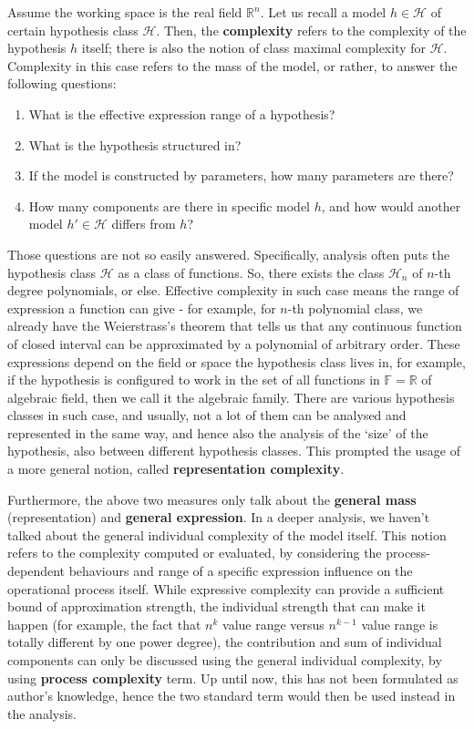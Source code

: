 Assume the working space is the real field $\mathbb{R}^{n}$. Let us recall a model $h\in\mathcal{H}$ of certain hypothesis class $\mathcal{H}$. Then, the \textbf{complexity} refers to the complexity of the hypothesis $h$ itself; there is also the notion of class maximal complexity for $\mathcal{H}$. Complexity in this case refers to the mass of the model, or rather, to answer the following questions:
\begin{enumerate}[itemsep=0.5pt,topsep=0.5pt]
    \item What is the effective expression range of a hypothesis?
    \item What is the hypothesis structured in?
    \item If the model is constructed by parameters, how many parameters are there?
    \item How many components are there in specific model $h$, and how would another model $h'\in \mathcal{H}$ differs from $h$?
\end{enumerate}
Those questions are not so easily answered. Specifically, analysis often puts the hypothesis class $\mathcal{H}$ as a class of functions. So, there exists the class $\mathcal{H}_{n}$ of $n$-th degree polynomials, or else. Effective complexity in such case means the range of expression a function can give - for example, for $n$-th polynomial class, we already have the Weierstrass's theorem that tells us that any continuous function of closed interval can be approximated by a polynomial of arbitrary order. These expressions depend on the field or space the hypothesis class lives in, for example, if the hypothesis is configured to work in the set of all functions in $\mathbb{F}=\mathbb{R}$ of algebraic field, then we call it the algebraic family. There are various hypothesis classes in such case, and usually, not a lot of them can be analysed and represented in the same way, and hence also the analysis of the `size' of the hypothesis, also between different hypothesis classes. This prompted the usage of a more general notion, called \textbf{representation complexity}.

Furthermore, the above two measures only talk about the \textbf{general mass} (representation) and \textbf{general expression}. In a deeper analysis, we haven't talked about the general individual complexity of the model itself. This notion refers to the complexity computed or evaluated, by considering the process-dependent behaviours and range of a specific expression influence on the operational process itself. While expressive complexity can provide a sufficient bound of approximation strength, the individual strength that can make it happen (for example, the fact that $n^{k}$ value range versus $n^{k-1}$ value range is totally different by one power degree), the contribution and sum of individual components can only be discussed using the general individual complexity, by using \textbf{process complexity} term. Up until now, this has not been formulated as author's knowledge, hence the two standard term would then be used instead in the analysis. 


